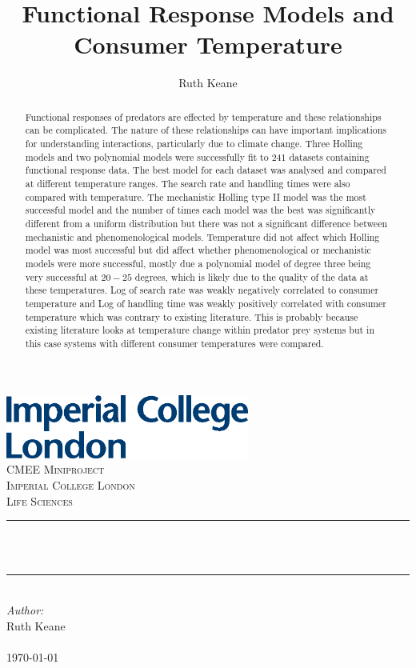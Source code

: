 \documentclass{article}
\newcommand{\HRule}{\rule{\linewidth}{1mm}}
\begin{document}
\title{Functional Response Models and Consumer Temperature}%
\author{Ruth Keane}

\begin{titlepage}
\includegraphics[width=8cm]{logo.eps}\\[1cm] 
\center 
\textsc{\LARGE CMEE Miniproject}\\[1.5cm] 
\textsc{\Large Imperial College London}\\[0.5cm]
\textsc{\large Life Sciences}\\[0.5cm] 
\makeatletter
\HRule \\[0.4cm]
{ \huge \bfseries \@title}\\[0.4cm] %
\HRule \\[1.5cm]
\makeatother
\Large \emph{Author:}\\
Ruth Keane \\[3cm] %
\\
{\large \today}\\[2cm] %
\vfill %
\clearpage
\end{titlepage}
\tableofcontents
\newpage
\linenumbers
\begin{abstract}
Functional responses of predators are effected by temperature and these relationships can be complicated. The nature of these relationships can have important implications for understanding interactions, particularly due to climate change. Three Holling models and two polynomial models were successfully fit to $241$ datasets containing functional response data. The best model for each dataset was analysed and compared at different temperature ranges. The search rate and handling times were also compared with temperature. The mechanistic Holling type II model was the most successful model  and the number of times each model was the best was significantly different from a uniform distribution but there was not a significant difference between mechanistic and phenomenological models. Temperature did not affect which Holling model was most successful but did affect whether phenomenological or mechanistic models were more successful, mostly due a polynomial model of degree three being very successful at $20-25$ degrees, which is likely due to the quality of the data at these temperatures. Log of search rate was weakly negatively correlated  to consumer temperature and Log of handling time was weakly positively correlated with consumer temperature which was contrary to existing literature. This is probably because existing literature looks at temperature change within predator prey systems but in this case systems with different consumer temperatures were compared. 
\end{abstract}
\end{document}
